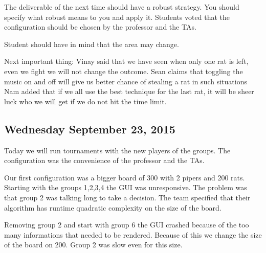 The deliverable of the next time should have a robust strategy. You should specify what robust means to you and apply it.
Students voted that the configuration should be chosen by the professor and the TAs.

Student should have in mind that the area may change.

Next important thing:
Vinay said that we have seen when only one rat is left, even we fight we will not change the outcome.
Sean claims that toggling the music on and off will give us better chance of stealing a rat in such situations
Nam added that if we all use the best technique for the last rat, it will be sheer luck who we will get if we do not hit the time limit.

\subsection{Wednesday September 23, 2015}
Today we will run tournaments with the new players of the groups.
The configuration was the convenience of the professor and the TAs.

Our first configuration was a bigger board of 300 with 2 pipers and 200 rats.
Starting with the groups 1,2,3,4 the GUI was unresponsive. The problem was that group 2 was talking long to take a decision. The team specified that their algorithm has runtime quadratic complexity on the size of the board.

Removing group 2 and start with group 6 the GUI crashed because of the too many informations that needed to be rendered. Because of this we change the size of the board on 200. Group 2 was slow even for this size.

